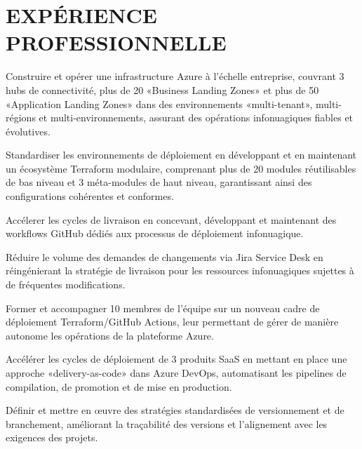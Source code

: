 \documentclass[11pt]{deedy-resume-openfont}
\begin{document}
\section{EXPÉRIENCE PROFESSIONNELLE}
\sectionsepsmall
{}\hfill {}
\begin{tightemize}
	\item Construire et opérer une infrastructure Azure à l'échelle entreprise, couvrant 3 hubs de connectivité, plus de 20 «Business Landing Zones» et plus de 50 «Application Landing Zones» dans des environnements «multi-tenant», multi-régions et multi-environnements, assurant des opérations infonuagiques fiables et évolutives.
	\item Standardiser les environnements de déploiement en développant et en maintenant un écosystème Terraform modulaire, comprenant plus de 20 modules réutilisables de bas niveau et 3 méta-modules de haut niveau, garantissant ainsi des configurations cohérentes et conformes.
	\item Accélerer les cycles de livraison en concevant, développant et maintenant des workflows GitHub dédiés aux processus de déploiement infonuagique.
	\item Réduire le volume des demandes de changements via Jira Service Desk en réingénierant la stratégie de livraison pour les ressources infonuagiques sujettes à de fréquentes modifications.
	\item Former et accompagner 10 membres de l'équipe sur un nouveau cadre de déploiement Terraform/GitHub Actions, leur permettant de gérer de manière autonome les opérations de la plateforme Azure.
\end{tightemize}
\sectionsep
{}
\sectionsep
{}\hfill {}
\begin{tightemize}
	\item Accélérer les cycles de déploiement de 3 produits SaaS en mettant en place une approche «delivery-as-code» dans Azure DevOps, automatisant les pipelines de compilation, de promotion et de mise en production.
	\item Définir et mettre en œuvre des stratégies standardisées de versionnement et de branchement, améliorant la traçabilité des versions et l'alignement avec les exigences des projets.
\end{tightemize}
\end{document}
